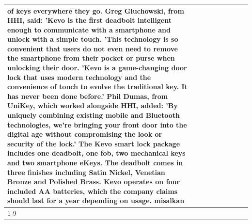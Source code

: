 \begin{table}[H]
\begin{tabular}{lllrlllll}
of keys everywhere they go. Greg Gluchowski, from HHI, said: 'Kevo is the first deadbolt intelligent enough to communicate with a smartphone and unlock with a simple touch. 'This technology is so convenient that users do not even need to remove the smartphone from their pocket or purse when unlocking their door. 'Kevo is a game-changing door lock that uses modern technology and the convenience of touch to evolve the traditional key. It has never been done before.' Phil Dumas, from UniKey, which worked alongside HHI, added: 'By uniquely combining existing mobile and Bluetooth technologies, we’re bringing your front door into the digital age without compromising the look or security of the lock.' The Kevo smart lock package includes one deadbolt, one fob, two mechanical keys and two smartphone eKeys. The deadbolt comes in three finishes including Satin Nickel, Venetian Bronze and Polished Brass. Kevo operates on four included AA batteries, which the company claims should last for a year depending on usage. misalkan \\
\cline{1-9}

\end{tabular}
\end{table}
